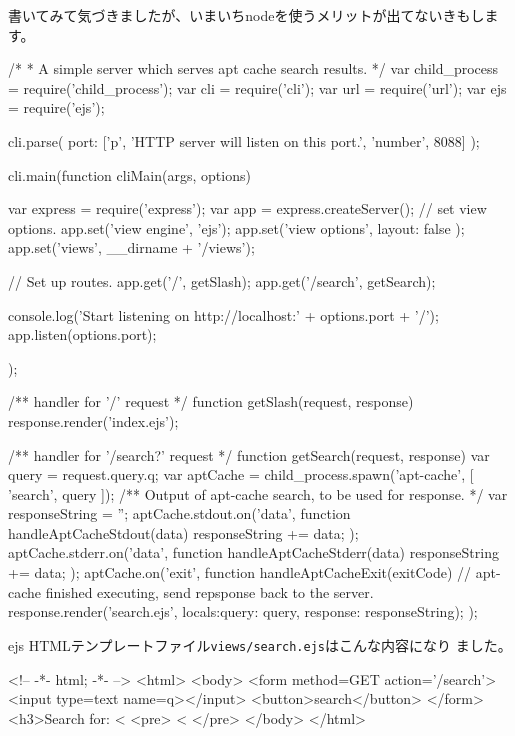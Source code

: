 \documentclass[mingoth,a4paper]{jsarticle}
\begin{document}
書いてみて気づきましたが、いまいちnodeを使うメリットが出てないきもしま
す。


\begin{commandline}
/*
 * A simple server which serves apt cache search results.
 */
var child_process = require('child_process');
var cli = require('cli');
var url = require('url');
var ejs = require('ejs');

cli.parse({
    port: ['p', 'HTTP server will listen on this port.', 'number', 8088]
});

cli.main(function cliMain(args, options) {
    var express = require('express');
    var app = express.createServer();
    // set view options.
    app.set('view engine', 'ejs');
    app.set('view options', { layout: false });
    app.set('views', __dirname + '/views');

    // Set up routes.
    app.get('/', getSlash);
    app.get('/search', getSearch);

    console.log('Start listening on http://localhost:' + options.port + '/');
    app.listen(options.port);
});

/** handler for '/' request */
function getSlash(request, response) {
    response.render('index.ejs');
}

/** handler for '/search?' request */
function getSearch(request, response) {
    var query = request.query.q;
    var aptCache = child_process.spawn('apt-cache', 
				       [ 'search', query ]);
    /** Output of apt-cache search, to be used for response. */
    var responseString = '';
    aptCache.stdout.on('data', function handleAptCacheStdout(data) {
	responseString += data;
    });
    aptCache.stderr.on('data', function handleAptCacheStderr(data) {
	responseString += data;
    });
    aptCache.on('exit', function handleAptCacheExit(exitCode) {
	// apt-cache finished executing, send repsponse back to the server.
	response.render('search.ejs',
			{locals:{query: query,
				 response: responseString}});
    });
}
\end{commandline}

ejs HTMLテンプレートファイル\texttt{views/search.ejs}はこんな内容になり
ました。

\begin{commandline}
<!-- -*- html; -*- -->
<html>
  <body>
    <form
      method=GET 
      action='/search'>
      <input type=text name=q></input>
      <button>search</button>
    </form>
    <h3>Search for: <%
    <pre>
<%
    </pre>
  </body>
</html> 
\end{commandline}
\end{document}
